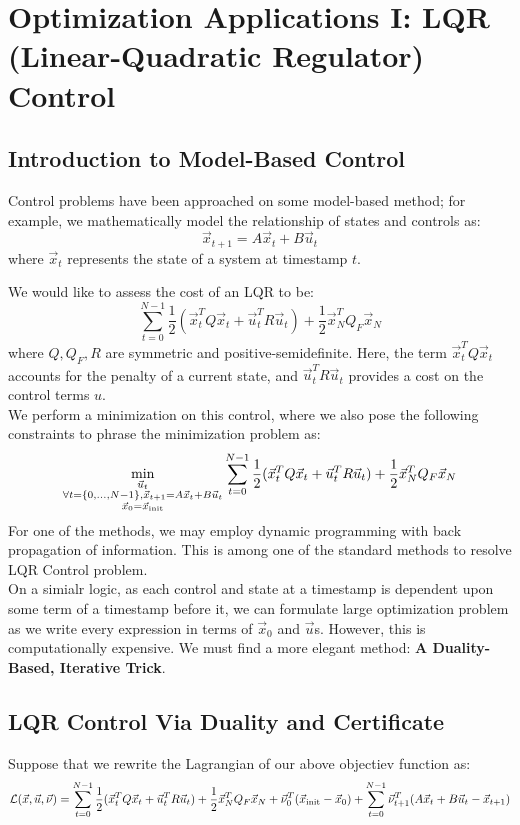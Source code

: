 \chapter{Optimization Applications I: LQR (Linear-Quadratic Regulator) Control}

\section{Introduction to Model-Based Control}
Control problems have been approached on some model-based method; for example, we mathematically model the relationship of states and controls as:
\[
    \vec{x}_{t + 1} = A \vec{x}_t + B \vec{u}_t
\]
where $\vec{x}_t$ represents the state of a system at timestamp $t$.

We would like to assess the cost of an LQR to be:
\[
    \sum_{t = 0}^{N - 1} \frac{1}{2} (\vec{x}_t^T Q \vec{x}_t + \vec{u}_t^T R \vec{u}_t) + \frac{1}{2} \vec{x}_N^T Q_F \vec{x}_N
\]
where $Q, Q_F, R$ are symmetric and positive-semidefinite.
Here, the term $\vec{x}_t^T Q \vec{x}_t$ accounts for the penalty of a current state, and $\vec{u}_t^T R \vec{u}_t$ provides a cost on the control terms $u$. \\
We perform a minimization on this control, where we also pose the following constraints to phrase the minimization problem as:
\[
    \min_{
        \substack{
            \vec{u}_t \\
            \forall t = \{0, \dots, N - 1\}, \vec{x}_{t + 1} = A \vec{x}_t + B \vec{u}_t \\
            \vec{x}_0 = \vec{x}_{\rm init}
        }
    } \sum_{t = 0}^{N - 1} \frac{1}{2} (\vec{x}_t^T Q \vec{x}_t + \vec{u}_t^T R \vec{u}_t) + \frac{1}{2} \vec{x}_N^T Q_F \vec{x}_N
\]
For one of the methods, we may employ dynamic programming with back propagation of information. This is among one of the standard methods to resolve LQR Control problem. \\
On a simialr logic, as each control and state at a timestamp is dependent upon some term of a timestamp before it, we can formulate large optimization problem as we write every expression in terms of $\vec{x}_0$ and $\vec{u}$s.
However, this is computationally expensive. We must find a more elegant method: \textbf{A Duality-Based, Iterative Trick}.

\section{LQR Control Via Duality and Certificate}
Suppose that we rewrite the Lagrangian of our above objectiev function as:
\[
    \mathcal{L}(\vec{x}, \vec{u}, \vec{\nu}) =
    \sum_{t = 0}^{N - 1} \frac{1}{2} (\vec{x}_t^T Q \vec{x}_t + \vec{u}_t^T R \vec{u}_t) + \frac{1}{2} \vec{x}_N^T Q_F \vec{x}_N + \vec{\nu}_0^T (\vec{x}_{\rm init} - \vec{x}_0) + \sum_{t = 0}^{N - 1} \vec{\nu}_{t + 1}^T (A \vec{x}_t + B \vec{u}_t - \vec{x}_{t + 1})
\]

